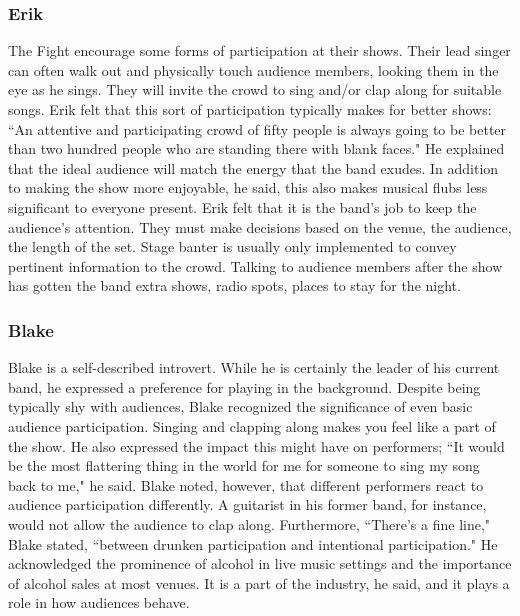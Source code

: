 \subsubsection{Erik}
The Fight encourage some forms of participation at their shows. Their lead singer can often walk out and physically touch audience members, looking them in the eye as he sings. They will invite the crowd to sing and/or clap along for suitable songs. Erik felt that this sort of participation typically makes for better shows: ``An attentive and participating crowd of fifty people is always going to be better than two hundred people who are standing there with blank faces." He explained that the ideal audience will match the energy that the band exudes. In addition to making the show more enjoyable, he said, this also makes musical flubs less significant to everyone present. Erik felt that it is the band's job to keep the audience's attention. They must make decisions based on the venue, the audience, the length of the set. Stage banter is usually only implemented to convey pertinent information to the crowd. Talking to audience members after the show has gotten the band extra shows, radio spots, places to stay for the night. 

\subsubsection{Blake}
Blake is a self-described introvert. While he is certainly the leader of his current band, he expressed a preference for playing in the background. Despite being typically shy with audiences, Blake recognized the significance of even basic audience participation. Singing and clapping along makes you feel like a part of the show. He also expressed the impact this might have on performers; ``It would be the most flattering thing in the world for me for someone to sing my song back to me," he said. Blake noted, however, that different performers react to audience participation differently. A guitarist in his former band, for instance, would not allow the audience to clap along. Furthermore, ``There's a fine line," Blake stated, ``between drunken participation and intentional participation." He acknowledged the prominence of alcohol in live music settings and the importance of alcohol sales at most venues. It is a part of the industry, he said, and it plays a role in how audiences behave.

